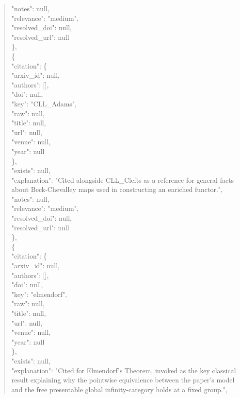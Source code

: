 \documentclass[11pt]{article}
\begin{document}
\begin{quote}
      "notes": null,\\
      "relevance": "medium",\\
      "resolved\_doi": null,\\
      "resolved\_url": null\\
    \},\\
    \{\\
      "citation": \{\\
        "arxiv\_id": null,\\
        "authors": [],\\
        "doi": null,\\
        "key": "CLL\_Adams",\\
        "raw": null,\\
        "title": null,\\
        "url": null,\\
        "venue": null,\\
        "year": null\\
      \},\\
      "exists": null,\\
      "explanation": "Cited alongside CLL\_Clefts as a reference for general facts about Beck-Chevalley maps used in constructing an enriched functor.",\\
      "notes": null,\\
      "relevance": "medium",\\
      "resolved\_doi": null,\\
      "resolved\_url": null\\
    \},\\
    \{\\
      "citation": \{\\
        "arxiv\_id": null,\\
        "authors": [],\\
        "doi": null,\\
        "key": "elmendorf",\\
        "raw": null,\\
        "title": null,\\
        "url": null,\\
        "venue": null,\\
        "year": null\\
      \},\\
      "exists": null,\\
      "explanation": "Cited for Elmendorf's Theorem, invoked as the key classical result explaining why the pointwise equivalence between the paper's model and the free presentable global infinity-category holds at a fixed group.",\\

\end{quote}
\end{document}
